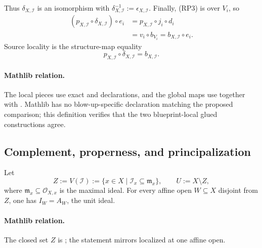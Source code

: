\begin{definition}
\[  \]
  Thus $\delta_{X,\mathcal I}$ is an isomorphism with
  $\delta_{X,\mathcal I}^{-1}:=\epsilon_{X,\mathcal I}$.  Finally, (RP3)
  is over $V_i$, so
  \[
  \begin{aligned}
    (p_{X,\mathcal I}\circ\delta_{X,\mathcal I})\circ e_i
      &=p_{X,\mathcal I}\circ j_i\circ d_i\\
      &=v_i\circ b_{V_i}
       =b_{X,\mathcal I}\circ e_i.
  \end{aligned}
  \]
  Source locality is the structure-map equality
  \[
    p_{X,\mathcal I}\circ\delta_{X,\mathcal I}
      =b_{X,\mathcal I}.                                      \tag{RP10}
  \]

  \paragraph{Mathlib relation.}
  The local pieces use exact \texttt{}
  and \texttt{} declarations, and the global maps
  use \texttt{} together with
  \texttt{}.  Mathlib has no
  blow-up-specific declaration matching the proposed comparison; this
  definition verifies that the two blueprint-local glued constructions agree.
\end{definition}

\subsection{Complement, properness, and principalization}

\begin{lemma}
  \label{lemma:nagata-ideal-unit-off-support}
  \leanok

  Let
  \[
    Z:=V(\mathcal I)
      :=\{x\in X\mid\mathcal I_x\subseteq\mathfrak m_x\},
    \qquad U:=X\setminus Z,
  \]
  where $\mathfrak m_x\subseteq\mathcal O_{X,x}$ is the maximal ideal.
  For every affine open $W\subseteq X$ disjoint from $Z$, one has
  $I_W=A_W$, the unit ideal.

  \paragraph{Mathlib relation.}
  The closed set $Z$ is
  \texttt{};
  the statement mirrors
  \texttt{}
  localized at one affine open.
\end{lemma}

